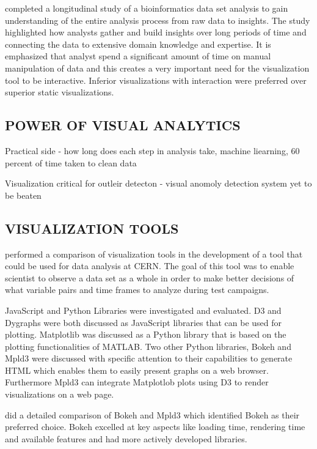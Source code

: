 \cite{saraiya2006insight} completed a longitudinal study of a bioinformatics data set analysis to gain understanding of the entire analysis process from raw data to insights. The study highlighted how analysts gather and build insights over long periods of time and connecting the data to extensive domain knowledge and expertise. It is emphasized that analyst spend a significant amount of time on manual manipulation of data and this creates a very important need for the visualization tool to be interactive. Inferior visualizations with interaction were preferred over superior static visualizations.

\subsection{POWER OF VISUAL ANALYTICS}

Practical side - how long does each step in analysis take, machine liearning, 60 percent of time taken to clean data

Visualization critical for outleir detecton - visual anomoly detection system yet to be beaten

\subsection{VISUALIZATION TOOLS}

\cite{barnard2015usability} performed a comparison of visualization tools in the development of a tool that could be used for data analysis at CERN. The goal of this tool was to enable scientist to observe a data set as a whole in order to make better decisions of what variable pairs and time frames to analyze during test campaigns.

JavaScript and Python Libraries were investigated and evaluated. D3 and Dygraphs were both discussed as JavaScript libraries that can be used for plotting. Matplotlib was discussed as a Python library that is based on the plotting functionalities of MATLAB. Two other Python libraries, Bokeh and Mpld3 were discussed with specific attention to their capabilities to generate HTML which enables them to easily present graphs on a web browser. Furthermore Mpld3 can integrate Matplotlob plots using D3 to render visualizations on a web page.

\cite{barnard2015usability} did a detailed comparison of Bokeh and Mpld3 which identified Bokeh as their preferred choice. Bokeh excelled at key aspects like loading time, rendering time and available features and had more actively developed libraries.

